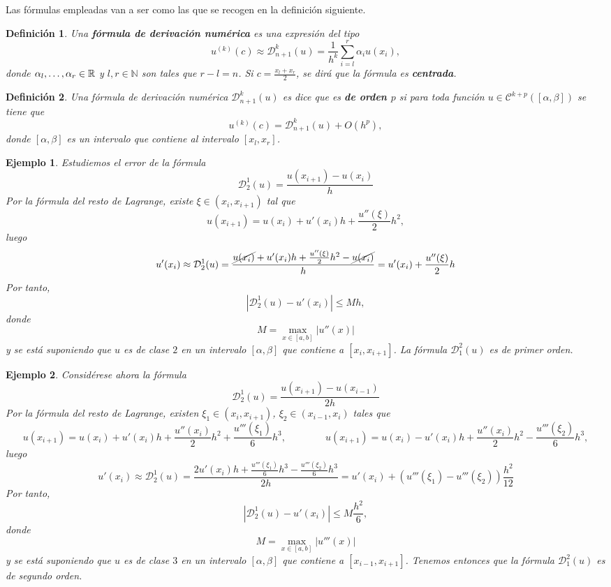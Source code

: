 \documentclass[11pt]{report}
\theoremstyle{mytheorem}
\theoremstyle{mydefinition}
\newtheorem{definition}{Definición}
\theoremstyle{myexample}
\newtheorem*{example}{Ejemplo}
\newenvironment{cdefinition} %
  {\begin{mdframed}[
        linewidth=3pt,
        linecolor=c1,
        bottomline=false,
        topline=false,
        rightline=false,
        innerrightmargin=0pt,
        innertopmargin=0pt,
        innerbottommargin=0pt,
        innerleftmargin=1em, %
        skipabove=\baselineskip]
    \begin{definition}}
  {\end{definition}\end{mdframed}}
\newcommand{\R}{\mathbb R}
\newcommand{\N}{\mathbb N}
\newcommand{\mybf}[1]{\boldmath\textbf{\color{c1}#1}\unboldmath}
\begin{document}
Las fórmulas empleadas van a ser como las que se recogen en la definición siguiente.
\begin{cdefinition}
    Una \mybf{fórmula de derivación numérica} es una expresión del tipo
    \[u^{(k)}(c)\approx \mathcal{D}_{n+1}^k(u) = \frac{1}{h^k}\sum_{i=l}^r \alpha_iu(x_i),\]
donde $\alpha_l,\mathellipsis,\alpha_r \in \R$ y $l,r \in \N$ son tales que $r-l=n$. Si $c = \frac{x_l+x_r}{2}$, se dirá que la fórmula es \mybf{centrada}.
\end{cdefinition}

\begin{cdefinition}
    Una fórmula de derivación numérica $\mathcal{D}_{n+1}^k(u)$ es dice que es \mybf{de orden $p$} si para toda función $u \in \mathcal{C}^{k+p}([\alpha,\beta])$ se tiene que
    \[u^{(k)}(c)=\mathcal{D}_{n+1}^k(u)+O(h^p),\]
    donde $[\alpha,\beta]$ es un intervalo que contiene al intervalo $[x_l,x_r]$.
\end{cdefinition}

\begin{example}
    
    Estudiemos el error de la fórmula
\[\mathcal{D}_{2}^1(u) = \frac{u(x_{i+1})-u(x_i)}{h}\]
Por la fórmula del resto de Lagrange, existe $\xi \in (x_i,x_{i+1})$ tal que
\[u(x_{i+1}) = u(x_i)+u'(x_i)h+\frac{u''(\xi)}{2}h^2,\]
luego
\[u'(x_i) \approx \mathcal{D}_2^1(u) = \frac{\cancel{u(x_i)}+u'(x_i)h+\frac{u''(\xi)}{2}h^2-\cancel{u(x_i)}}{h} = u'(x_i)+\frac{u''(\xi)}{2}h\]
Por tanto,
\[|\mathcal{D}_2^1(u)-u'(x_i)| \leq Mh,\]
donde
\[M = \max_{x \in [a,b]}|u''(x)|\]
y se está suponiendo que $u$ es de clase $2$ en un intervalo $[\alpha,\beta]$ que contiene a $[x_i,x_{i+1}]$. La fórmula $\mathcal{D}_1^2(u)$ es de primer orden.

\end{example}

\begin{example}
    Considérese ahora la fórmula
\[\mathcal{D}_{2}^1(u) = \frac{u(x_{i+1})-u(x_{i-1})}{2h}\]
Por la fórmula del resto de Lagrange, existen $\xi_1 \in (x_i,x_{i+1})$, $\xi_2\in (x_{i-1},x_i)$ tales que
\[u(x_{i+1}) = u(x_i)+u'(x_i)h+\frac{u''(x_i)}{2}h^2+\frac{u'''(\xi_1)}{6}h^3, \qquad \qquad u(x_{i+1}) = u(x_i)-u'(x_i)h+\frac{u''(x_i)}{2}h^2-\frac{u'''(\xi_2)}{6}h^3,\]
luego
\[u'(x_i) \approx \mathcal{D}_2^1(u) = \frac{2u'(x_i)h+\frac{u'''(\xi_1)}{6}h^3-\frac{u'''(\xi_2)}{6}h^3}{2h} = u'(x_i)+\left(u'''(\xi_1)-u'''(\xi_2)\right)\frac{h^2}{12}\]
Por tanto,
\[|\mathcal{D}_2^1(u)-u'(x_i)| \leq M\frac{h^2}{6},\]
donde
\[M = \max_{x \in [a,b]}|u'''(x)|\]
y se está suponiendo que $u$ es de clase $3$ en un intervalo $[\alpha,\beta]$ que contiene a $[x_{i-1},x_{i+1}]$. Tenemos entonces que la fórmula $\mathcal{D}_1^2(u)$ es de segundo orden. 
\end{example}
\end{document}
